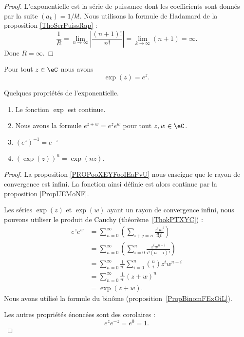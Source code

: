 \begin{proof}
	L'exponentielle est la série de puissance dont les coefficients sont donnés par la suite \( (a_k)=1/k!\). Nous utilisons la formule de Hadamard de la proposition \ref{ThoSerPuissRap} :
	\begin{equation}
		\frac{1}{ R }=\lim_{n\to \infty} \left| \frac{ (n+1)! }{ n! } \right| =\lim_{k\to \infty} (n+1)=\infty.
	\end{equation}
	Donc \( R=\infty\).
\end{proof}

\begin{proposition}     \label{PROPooWSDKooJREQGk}
	Pour tout \( z\in \eC\) nous avons
	\begin{equation}
		\exp(z)= e^{z}.
	\end{equation}
\end{proposition}

\begin{proposition}     \label{PropdDjisy}
	Quelques propriétés de l'exponentielle.
	\begin{enumerate}
		\item
		      Le fonction \( \exp\) est continue.
		\item       \label{ITEMooRLHCooJTuYKV}
		      Nous avons la formule \(  e^{z+w}= e^{z}e^w\) pour tout \( z,w\in \eC\).
		\item
		      \( (e^z)^{-1}= e^{-z}\)
		\item       \label{ITEMooIFYFooUniuKS}
		      \( (\exp(z))^n=\exp(nz)\).
	\end{enumerate}
\end{proposition}

\begin{proof}
	La proposition \ref{PROPooXEYFooIEaPvU} nous enseigne que le rayon de convergence est infini. La fonction ainsi définie est alors continue par la proposition \ref{PropUEMoNF}.

	Les séries \( \exp(z)\) et \( \exp(w)\) ayant un rayon de convergence infini, nous pouvons utiliser le produit de Cauchy (théorème~\ref{ThokPTXYC}) :
	\begin{subequations}
		\begin{align}
			e^{z} e^{w} & =\sum_{n=0}^{\infty}\left( \sum_{i+j=n}\frac{ z^iw^j }{ i!j! } \right)         \\
			            & =\sum_{n=0}^{\infty}\left( \sum_{i=0}^n\frac{ z^iw^{n-i} }{ i!(n-i)! } \right) \\
			            & =\sum_{n=0}^{\infty}\frac{1}{ n! }\sum_{i=0}^{n}{n\choose i}z^iw^{n-i}         \\
			            & =\sum_{n=0}^{\infty}\frac{1}{ n! }(z+w)^{n}                                    \\
			            & =\exp(z+w).
		\end{align}
	\end{subequations}
	Nous avons utilisé la formule du binôme (proposition~\ref{PropBinomFExOiL}).

	Les autres propriétés énoncées sont des corolaires :
	\begin{equation}
		e^{z} e^{-z}= e^{0}=1.
	\end{equation}
\end{proof}

